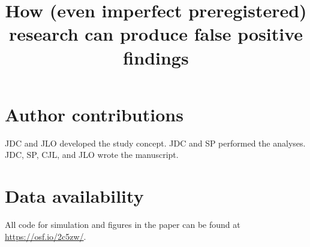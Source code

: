 \documentclass[english,natbib,man,floatsintext]{apa6}
\title{How (even imperfect preregistered) research can produce false positive findings}
\begin{document}
\maketitle









\section{Author contributions}
JDC and JLO developed the study concept. JDC and SP performed the analyses. JDC, SP, CJL, and JLO wrote the manuscript. 

\section{Data availability}
All code for simulation and figures in the paper can be found at \url{https://osf.io/2c5zw/}.



\clearpage

 
 \newpage
 
\end{document}

